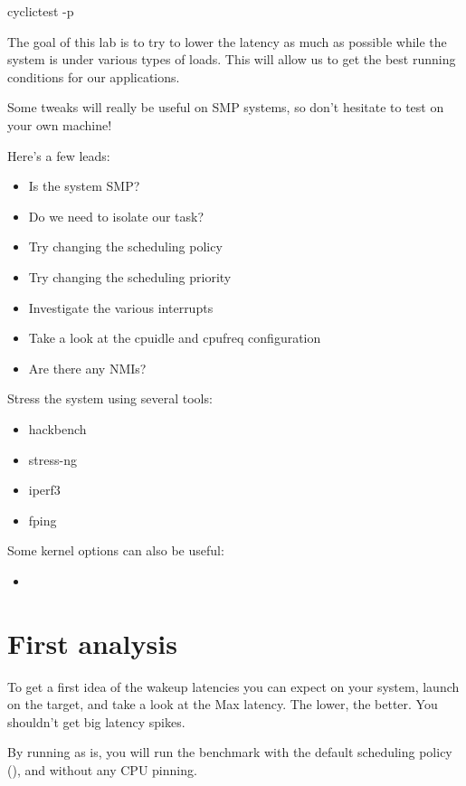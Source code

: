 \begin{bashinput}
cyclictest -p 
\end{bashinput}

The goal of this lab is to try to lower the latency as much as possible while
the system is under various types of loads. This will allow us to get the
best running conditions for our applications.

Some tweaks will really be useful on SMP systems, so don't hesitate to test on
your own machine!

Here's a few leads:

\begin{itemize}
	\item Is the system SMP?
	\item Do we need to isolate our task?
	\item Try changing the scheduling policy
	\item Try changing the scheduling priority
	\item Investigate the various interrupts
	\item Take a look at the cpuidle and cpufreq configuration
	\item Are there any NMIs?
\end{itemize}

Stress the system using several tools:

\begin{itemize}
	\item hackbench
	\item stress-ng
	\item iperf3
	\item fping
\end{itemize}

Some kernel options can also be useful:

\begin{itemize}
	\item {}
\end{itemize}

\section{First analysis}

To get a first idea of the wakeup latencies you can expect on your system, launch
 on the target, and take a look at the Max latency. The lower, the
better. You shouldn't get big latency spikes.

By running  as is, you will run the benchmark with the default
scheduling policy (), and without any CPU pinning.

